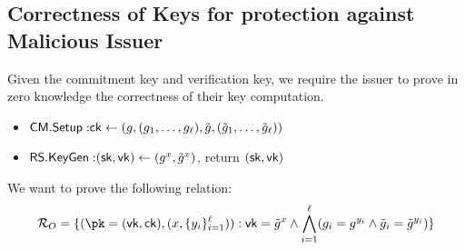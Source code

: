 \newpage
\subsection{Correctness of Keys for protection against Malicious Issuer}\label{pok-ps}
Given the commitment key and verification key, we require the issuer to prove in zero knowledge the correctness of their key computation. 
\begin{itemize}
    \item $\mathsf{CM.Setup:} \mathsf{ck} \gets (g, (g_1,\ldots,g_\ell), \tilde{g}, (\tilde{g}_1,\ldots,\tilde{g}_\ell))$
    \item $\mathsf{RS.KeyGen:} (\mathsf{sk}, \mathsf{vk}) \gets (g^x, \tilde{g}^x)$, return $(\mathsf{sk}, \mathsf{vk})$
\end{itemize}

We want to prove the following relation:
\[
\mathcal{R}_O = \{(\pk = (\vk, \ck), (x, \{y_i\}_{i=1}^\ell)): 
    \vk = \tilde{g}^x \wedge
    \bigwedge_{i=1}^\ell (g_i = g^{y_i} \wedge \tilde{g}_i = \tilde{g}^{y_i})\}
\]


